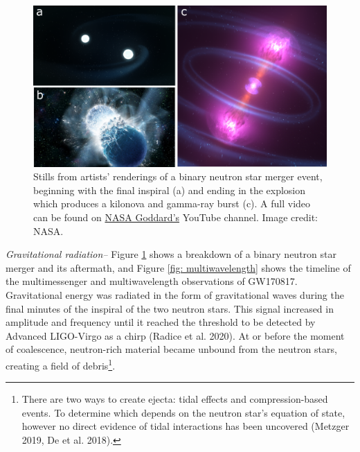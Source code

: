 \documentclass[1.5,11pt]{beavtex}
\begin{document}
\begin{figure}[ht!]
  \centering
  \includegraphics[scale=0.40]{images/ch1/merger_stills.png}
  \caption{\selectfont Stills from artists' renderings of a binary neutron star merger event, beginning with the final inspiral (a) and ending in the explosion which produces a kilonova and gamma-ray burst (c). A full video can be found on \href{https://www.youtube.com/watch?v=x_Akn8fUBeQ}{NASA Goddard's} YouTube channel. Image credit: NASA.}
  \label{fig:NS merger}
\end{figure}

\textit{Gravitational radiation–} Figure \ref{fig:NS merger} shows a breakdown of a binary neutron star merger and its aftermath, and Figure \ref{fig: multiwavelength} shows the timeline of the multimessenger and multiwavelength observations of GW170817. Gravitational energy was radiated in the form of gravitational waves during the final minutes of the inspiral of the two neutron stars. This signal increased in amplitude and frequency until it reached the threshold to be detected by Advanced LIGO-Virgo as a chirp (Radice et al. 2020). At or before the moment of coalescence, neutron-rich material became unbound from the neutron stars, creating a field of debris\footnote{\selectfont There are two ways to create ejecta: tidal effects and compression-based events. To determine which depends on the neutron star's equation of state, however no direct evidence of tidal interactions has been uncovered (Metzger 2019, De et al. 2018).}. 
\end{document}
